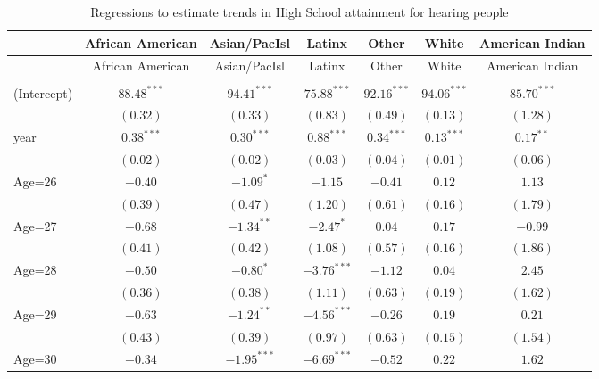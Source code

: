\documentclass[fullpage]{paper}
\begin{document}
\begin{center}
\begin{longtable}{l c c c c c c }
\hline
 & African American & Asian/PacIsl & Latinx & Other & White & American Indian \\
\hline
\endfirsthead
\hline
 & African American & Asian/PacIsl & Latinx & Other & White & American Indian \\
\hline
\endhead
\hline
\endfoot
\hline
\multicolumn{7}{l}{\scriptsize{$^{***}p<0.001$, $^{**}p<0.01$, $^*p<0.05$}}\\
\caption{Regressions to estimate trends in High School attainment for hearing people}
\label{table:coefficients}
\endlastfoot
(Intercept) & $88.48^{***}$ & $94.41^{***}$  & $75.88^{***}$  & $92.16^{***}$  & $94.06^{***}$ & $85.70^{***}$ \\
            & $(0.32)$      & $(0.33)$       & $(0.83)$       & $(0.49)$       & $(0.13)$      & $(1.28)$      \\
year        & $0.38^{***}$  & $0.30^{***}$   & $0.88^{***}$   & $0.34^{***}$   & $0.13^{***}$  & $0.17^{**}$   \\
            & $(0.02)$      & $(0.02)$       & $(0.03)$       & $(0.04)$       & $(0.01)$      & $(0.06)$      \\
Age=26      & $-0.40$       & $-1.09^{*}$    & $-1.15$        & $-0.41$        & $0.12$        & $1.13$        \\
            & $(0.39)$      & $(0.47)$       & $(1.20)$       & $(0.61)$       & $(0.16)$      & $(1.79)$      \\
Age=27      & $-0.68$       & $-1.34^{**}$   & $-2.47^{*}$    & $0.04$         & $0.17$        & $-0.99$       \\
            & $(0.41)$      & $(0.42)$       & $(1.08)$       & $(0.57)$       & $(0.16)$      & $(1.86)$      \\
Age=28      & $-0.50$       & $-0.80^{*}$    & $-3.76^{***}$  & $-1.12$        & $0.04$        & $2.45$        \\
            & $(0.36)$      & $(0.38)$       & $(1.11)$       & $(0.63)$       & $(0.19)$      & $(1.62)$      \\
Age=29      & $-0.63$       & $-1.24^{**}$   & $-4.56^{***}$  & $-0.26$        & $0.19$        & $0.21$        \\
            & $(0.43)$      & $(0.39)$       & $(0.97)$       & $(0.63)$       & $(0.15)$      & $(1.54)$      \\
Age=30      & $-0.34$       & $-1.95^{***}$  & $-6.69^{***}$  & $-0.52$        & $0.22$        & $1.62$        \\

\end{longtable}
\end{center}
\end{document}
